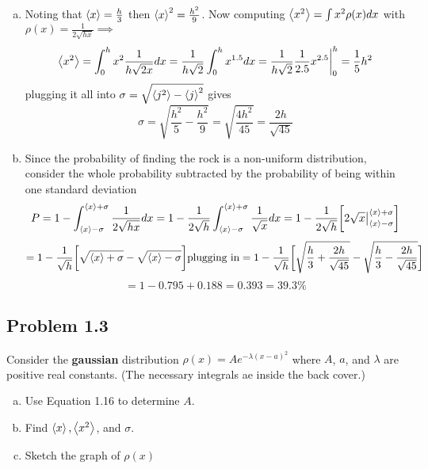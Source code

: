 \documentclass[12pt]{exam}
\begin{document}
\begin{solution}
    \begin{enumerate}[(a)]
        \item Noting that $\expval{x} = \frac{h}{3}$ then $\expval{x}^2 = \frac{h^2}{9}$. Now computing $\expval{x^2} = \int x^2\rho (x)dx$ with $\rho(x) = \frac{1}{2\sqrt{hx}} \implies$
        $$\expval{x^2} = \int^h_0 x^2 \frac{1}{h\sqrt{2x}} dx = \frac{1}{h\sqrt{2}} \int^h_0 x^{1.5}dx =  \frac{1}{h\sqrt{2}} \frac{1}{2.5} x^{2.5} \bigg|^h_0 = \frac{1}{5}h^2$$ plugging it all into $\sigma = \sqrt{\expval{j^2}-\expval{j}^2}$  gives 
        $$\sigma = \sqrt{\frac{h^2}{5}-\frac{h^2}{9}} = \sqrt{\frac{4h^2}{45}} = \frac{2h}{\sqrt{45}}$$

        \item Since the probability of finding the rock is a non-uniform distribution, consider the whole probability subtracted by the probability of being within one standard deviation 
        $$P = 1 - \int^{\expval{x}+\sigma}_{\expval{x}-\sigma} \frac{1}{2\sqrt{hx}}dx = 1-  \frac{1}{2\sqrt{h}}\int^{\expval{x}+\sigma}_{\expval{x}-\sigma} \frac{1}{\sqrt{x}}dx = 1- \frac{1}{2\sqrt{h}}\bigg[2\sqrt{x}\big|^{\expval{x}+\sigma}_{\expval{x}-\sigma}\bigg]$$
        $$=  1- \frac{1}{\sqrt{h}}\bigg[ \sqrt{\expval{x}+\sigma} - \sqrt{\expval{x}-\sigma}\bigg] \text{plugging in} = 1 - \frac{1}{\sqrt{h}}\bigg[ \sqrt{\frac{h}{3}+\frac{2h}{\sqrt{45}}} - \sqrt{\frac{h}{3}-\frac{2h}{\sqrt{45}}}\bigg]$$
        $$ = 1 - 0.795 + 0.188 = 0.393 = 39.3\%$$
    \end{enumerate}
\end{solution}




\subsection*{Problem 1.3}
Consider the \textbf{gaussian} distribution $\rho(x) = Ae^{-\lambda(x-a)^2}$ where $A$, $a$, and $\lambda$ are positive real constants. (The necessary integrals ae inside the back cover.)
\begin{enumerate}[(a)]
    \item Use Equation 1.16 to determine $A$.
    \item Find $\expval{x}, \expval{x^2}$, and $\sigma$.
    \item Sketch the graph of $\rho(x)$
\end{enumerate}
\end{document}
